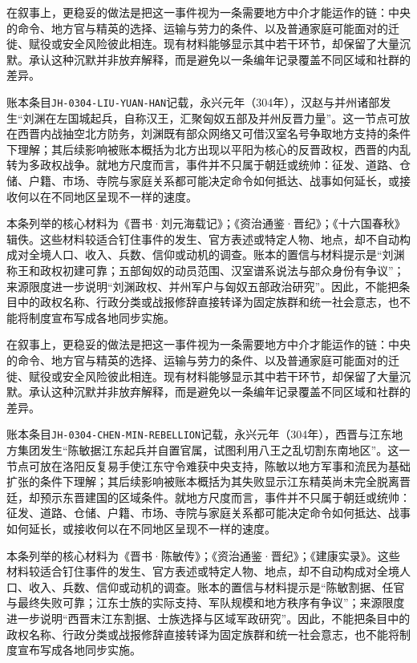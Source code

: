 在叙事上，更稳妥的做法是把这一事件视为一条需要地方中介才能运作的链：中央的命令、地方官与精英的选择、运输与劳力的条件、以及普通家庭可能面对的迁徙、赋役或安全风险彼此相连。现有材料能够显示其中若干环节，却保留了大量沉默。承认这种沉默并非放弃解释，而是避免以一条编年记录覆盖不同区域和社群的差异。

账本条目\texttt{JH-0304-LIU-YUAN-HAN}记载，永兴元年（304年），汉赵与并州诸部发生“刘渊在左国城起兵，自称汉王，汇聚匈奴五部及并州反晋力量”。这一节点可放在西晋内战抽空北方防务，刘渊既有部众网络又可借汉室名号争取地方支持的条件下理解；其后续影响被账本概括为北方出现以平阳为核心的反晋政权，西晋的内乱转为多政权战争。就地方尺度而言，事件并不只属于朝廷或统帅：征发、道路、仓储、户籍、市场、寺院与家庭关系都可能决定命令如何抵达、战事如何延长，或接收何以在不同地区呈现不一样的速度。

本条列举的核心材料为《晋书·刘元海载记》；《资治通鉴·晋纪》；《十六国春秋》辑佚。这些材料较适合钉住事件的发生、官方表述或特定人物、地点，却不自动构成对全境人口、收入、兵数、信仰或动机的调查。账本的置信与材料提示是“刘渊称王和政权初建可靠；五部匈奴的动员范围、汉室谱系说法与部众身份有争议”；来源限度进一步说明“刘渊政权、并州军户与匈奴五部政治研究”。因此，不能把条目中的政权名称、行政分类或战报修辞直接转译为固定族群和统一社会意志，也不能将制度宣布写成各地同步实施。

在叙事上，更稳妥的做法是把这一事件视为一条需要地方中介才能运作的链：中央的命令、地方官与精英的选择、运输与劳力的条件、以及普通家庭可能面对的迁徙、赋役或安全风险彼此相连。现有材料能够显示其中若干环节，却保留了大量沉默。承认这种沉默并非放弃解释，而是避免以一条编年记录覆盖不同区域和社群的差异。

账本条目\texttt{JH-0304-CHEN-MIN-REBELLION}记载，永兴元年（304年），西晋与江东地方集团发生“陈敏据江东起兵并自置官属，试图利用八王之乱切割东南地区”。这一节点可放在洛阳反复易手使江东守令难获中央支持，陈敏以地方军事和流民为基础扩张的条件下理解；其后续影响被账本概括为其失败显示江东精英尚未完全脱离晋廷，却预示东晋建国的区域条件。就地方尺度而言，事件并不只属于朝廷或统帅：征发、道路、仓储、户籍、市场、寺院与家庭关系都可能决定命令如何抵达、战事如何延长，或接收何以在不同地区呈现不一样的速度。

本条列举的核心材料为《晋书·陈敏传》；《资治通鉴·晋纪》；《建康实录》。这些材料较适合钉住事件的发生、官方表述或特定人物、地点，却不自动构成对全境人口、收入、兵数、信仰或动机的调查。账本的置信与材料提示是“陈敏割据、任官与最终失败可靠；江东士族的实际支持、军队规模和地方秩序有争议”；来源限度进一步说明“西晋末江东割据、士族选择与区域军政研究”。因此，不能把条目中的政权名称、行政分类或战报修辞直接转译为固定族群和统一社会意志，也不能将制度宣布写成各地同步实施。

